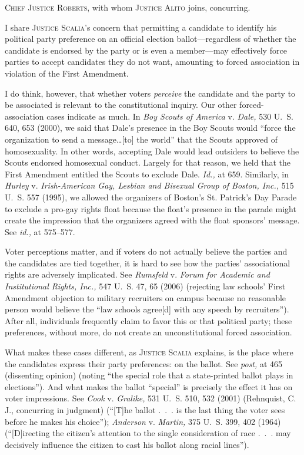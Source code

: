 
\setcounter{page}{459}

  \textsc{Chief Justice Roberts,} with whom \textsc{Justice Alito} joins,
concurring.

  I share \textsc{Justice Scalia}'s concern that permitting a candidate
to identify his political party preference on an official election
ballot---regardless of whether the candidate is endorsed by the party or
is even a member---may effectively force parties to accept candidates
they do not want, amounting to forced association in violation of the
First Amendment.

  I do think, however, that whether voters \emph{perceive} the candidate
and the party to be associated is relevant to the constitutional
inquiry. Our other forced-association cases indicate as much. In \emph{Boy
Scouts of America} v. \emph{Dale,} 530 U.~S. 640, 653 (2000), we said
that Dale's presence in the Boy Scouts would ``force the organization
to send a message\dots [to] the world'' that the Scouts approved of
homosexuality. In other words, accepting Dale would lead outsiders to
believe the Scouts endorsed homosexual conduct. Largely for that reason,
we held that the First Amendment entitled the Scouts to exclude Dale.
\emph{Id.,} at 659. Similarly, in \emph{Hurley} v. \emph{Irish-American Gay,
Lesbian and Bisexual Group of Boston, Inc.,} 515 U.~S. 557 (1995),
we allowed the organizers of Boston's St. Patrick's Day Parade to
exclude a pro-gay rights float because the float's presence in the
parade might create the impression that the organizers agreed with the
float sponsors' message. See \emph{id.,} at 575--577.\newpage 

  Voter perceptions matter, and if voters do not actually believe the
parties and the candidates are tied together, it is hard to see how
the parties' associational rights are adversely implicated. See
\emph{Rumsfeld} v. \emph{Forum for Academic and Institutional Rights, Inc.,}
547 U.~S. 47, 65 (2006) (rejecting law schools' First Amendment
objection to military recruiters on campus because no reasonable
person would believe the ``law schools agree[d] with any speech by
recruiters''). After all, individuals frequently claim to favor this
or that political party; these preferences, without more, do not create
an unconstitutional forced association.

  What makes these cases different, as \textsc{Justice Scalia} explains,
is the place where the candidates express their party preferences: on
the ballot. See \emph{post,} at 465 (dissenting opinion) (noting ``the
special role that a state-printed ballot plays in elections''). And
what makes the ballot ``special'' is precisely the effect it has on
voter impressions. See \emph{Cook} v. \emph{Gralike,} 531 U.~S. 510, 532
(2001) (Rehnquist, C. J., concurring in judgment) (``[T]he ballot
.~.~. is the last thing the voter sees before he makes his choice'');
\emph{Anderson} v. \emph{Martin,} 375 U.~S. 399, 402 (1964) (``[D]irecting
the citizen's attention to the single consideration of race .~.~.
may decisively influence the citizen to cast his ballot along racial
lines'').

